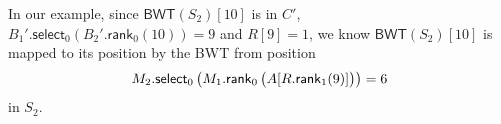 \documentclass{llncs}
\newcommand{\BWT}
  {\ensuremath{\mathsf{BWT}}}
\newcommand{\rank}
  {\ensuremath{\mathsf{rank}}}
\newcommand{\select}
  {\ensuremath{\mathsf{select}}}
\begin{document}
In our example, since \(\BWT (S_2) [10]\) is in $C'$, \(B_1'.\select_0 (B_2'.\rank_0 (10)) = 9\) and \(R [9] = 1\), we know \(\BWT (S_2) [10]\) is mapped to its position by the BWT from position
\[M_2.\select_0 \left(
    M_1.\rank_0 \left( \rule{0ex}{2ex}
      A [R.\rank_1 (9)]
    \right)
  \right)
= 6\]
in \(S_2\).
\end{document}
